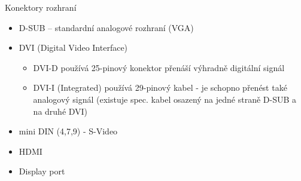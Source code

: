 \documentclass[aspectratio=43]{beamer}
\begin{document}
\begin{frame}{Konektory rozhraní}
	\begin{itemize}
		\item D-SUB – standardní analogové rozhraní (VGA)
		\item DVI (Digital Video Interface)
		      \begin{itemize}
		      	\item DVI-D používá 25-pinový konektor přenáší výhradně digitální signál
		      	\item DVI-I (Integrated) používá 29-pinový kabel - je schopno přenést také analogový signál (existuje spec. kabel osazený na jedné straně D-SUB a na druhé DVI)
		      \end{itemize}
		\item mini DIN (4,7,9) - S-Video
		\item HDMI
		\item Display port
	\end{itemize}
	

\end{frame}
\end{document}

